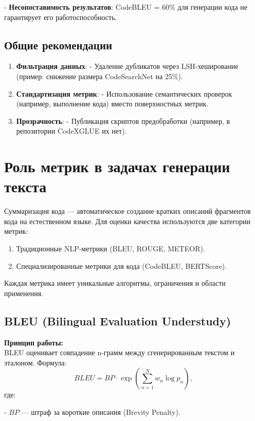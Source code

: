 \documentclass[14pt]{article}
\theoremstyle{definition}
\begin{document}
- \textbf{Несопоставимость результатов}: CodeBLEU = 60\% для генерации кода не гарантирует его работоспособность.


\subsection{Общие рекомендации}

\begin{enumerate}
    \item \textbf{Фильтрация данных}:  
      - Удаление дубликатов через LSH-хеширование (пример: снижение размера CodeSearchNet на 25\%).
    \item \textbf{Стандартизация метрик}:  
      - Использование семантических проверок (например, выполнение кода) вместо поверхностных метрик.
    \item \textbf{Прозрачность}:  
      - Публикация скриптов предобработки (например, в репозитории CodeXGLUE \cite{codexglue_repo} их нет).
\end{enumerate}

\newpage
\section{Роль метрик в задачах генерации текста}

Суммаризация кода — автоматическое создание кратких описаний фрагментов кода на естественном языке. Для оценки качества используются две категории метрик:

\begin{enumerate}
    \item Традиционные NLP-метрики (BLEU, ROUGE, METEOR).
    \item Специализированные метрики для кода (CodeBLEU, BERTScore).
\end{enumerate}

Каждая метрика имеет уникальные алгоритмы, ограничения и области применения.

\subsection{BLEU (Bilingual Evaluation Understudy)}

\textbf{Принцип работы:} \\
BLEU оценивает совпадение n-грамм между сгенерированным текстом и эталоном. Формула:
\[
BLEU = BP \cdot \exp\left(\sum_{n=1}^{N} w_n \log p_n\right),
\]
где:

    
- $BP$ — штраф за короткие описания (Brevity Penalty).
    
\end{document}

